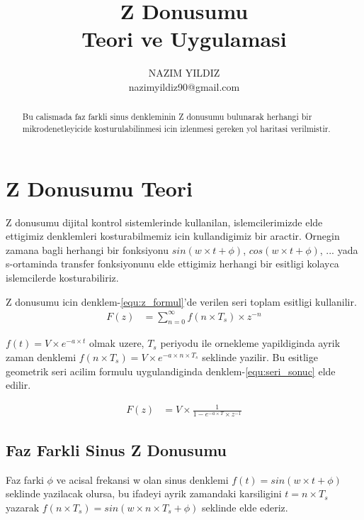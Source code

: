 \documentclass[10pt,a4paper]{article}
\title{Z Donusumu \\ 
		\large \vspace*{-10pt} Teori ve Uygulamasi\vspace*{10pt}}
\author{%
	NAZIM YILDIZ \\
	nazimyildiz90@gmail.com \\
	\vspace{20pt}
	}
\makeatletter
\def\printtitle{%
    {\color{bl} \centering \huge \sc \textbf{\@title}\par}}		%
\def\printauthor{%
    {\centering \small \@author}}				%
\makeatother
\begin{document}
\printtitle 

\printauthor

\begin{abstract}
Bu calismada faz farkli sinus denkleminin Z donusumu bulunarak herhangi bir mikrodenetleyicide kosturulabilinmesi icin izlenmesi gereken yol haritasi verilmistir.
\end{abstract}

\section{Z Donusumu Teori}
Z donusumu dijital kontrol sistemlerinde kullanilan, islemcilerimizde elde ettigimiz denklemleri kosturabilmemiz icin kullandigimiz bir aractir. Ornegin 
zamana bagli herhangi bir fonksiyonu $sin(w \times t + \phi)$, $cos(w \times t + \phi)$, ... yada s-ortaminda transfer fonksiyonunu elde ettigimiz herhangi bir esitligi kolayca islemcilerde kosturabiliriz.

Z donusumu icin denklem-\ref{equ:z_formul}'de verilen seri toplam esitligi kullanilir.
\begin{equation} \label{equ:z_formul} 
	\begin{split}
	F(z) 	&= \sum_{n = 0}^{\infty} f(n \times T_{s}) \times z^{-n}
	\end{split}					
\end{equation}

$f(t) = V \times e ^ {-a \times t}$ olmak uzere, $T_s$ periyodu ile ornekleme yapildiginda ayrik zaman denklemi $f(n \times T_s) = V \times e ^ {-a \times n \times T_s}$ seklinde yazilir. Bu esitlige geometrik seri acilim formulu uygulandiginda denklem-\ref{equ:seri_sonuc} elde edilir.

\begin{equation} \label{equ:seri_sonuc} 
\begin{split}
	F(z) 	&= V \times \frac{1}{1 - e ^ {-a \times T} \times z^{-1}}
\end{split}					
\end{equation}

\subsection{Faz Farkli Sinus Z Donusumu}
Faz farki $\phi$ ve acisal frekansi w olan sinus denklemi $f(t) = sin(w \times t + \phi)$ seklinde yazilacak olursa, bu ifadeyi ayrik zamandaki karsiligini $t = n \times T_s$ yazarak $f(n \times T_s) = sin(w \times n \times T_s + \phi)$ seklinde elde ederiz. \newline 
\end{document}
